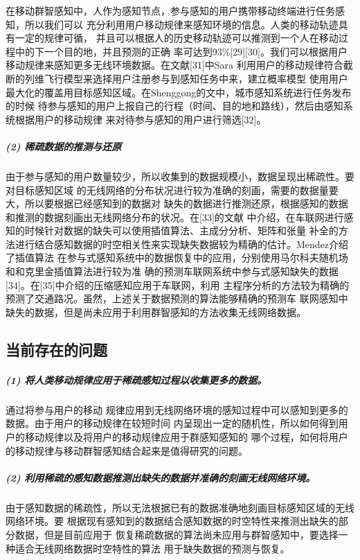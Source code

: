 \documentclass[UTF8]{ctexart}
\begin{document}
在移动群智感知中，人作为感知节点，参与感知的用户携带移动终端进行任务感知，所以我们可以
充分利用用户移动规律来感知环境的信息。人类的移动轨迹具有一定的规律可循，
并且可以根据人的历史移动轨迹可以推测到一个人在移动过程中的下一个目的地，并且预测的正确
率可达到93\%[29][30]。我们可以根据用户移动规律来感知更多无线环境数据。在文献[31]中Sara
利用用户的移动规律符合截断的列维飞行模型来选择用户注册参与到感知任务中来，建立概率模型
使用用户最大化的覆盖用目标感知区域。在Shenggong的文中，城市感知系统进行任务发布的时候
待参与感知的用户上报自己的行程（时间、目的地和路线），然后由感知系统根据用户的移动规律
来对待参与感知的用户进行筛选[32]。

\subparagraph{\textbf{(2) 稀疏数据的推测与还原}}

由于参与感知的用户数量较少，所以收集到的数据规模小，数据呈现出稀疏性。要对目标感知区域
的无线网络的分布状况进行较为准确的刻画，需要的数据量要大，所以要根据已经感知到的数据对
缺失的数据进行推测还原，根据感知的数据和推测的数据刻画出无线网络分布的状况。在[33]的文献
中介绍，在车联网进行感知的时候针对数据的缺失可以使用插值算法、主成分分析、矩阵和张量
补全的方法进行结合感知数据的时空相关性来实现缺失数据较为精确的估计。Mendez介绍了插值算法
在参与式感知系统中的数据恢复中的应用，分别使用马尔科夫随机场和和克里金插值算法进行较为准
确的预测车联网系统中参与式感知缺失的数据[34]。在[35]中介绍的压缩感知应用于车联网，利用
主程序分析的方法较为精确的预测了交通路况。虽然，上述关于数据预测的算法能够精确的预测车
联网感知中缺失的数据，但是尚未应用于利用群智感知的方法收集无线网络数据。

\subsection{当前存在的问题}
\subparagraph{(1) 将人类移动规律应用于稀疏感知过程以收集更多的数据。}

通过将参与用户的移动
规律应用到无线网络环境的感知过程中可以感知到更多的数据。由于用户的移动规律在较短时间
内呈现出一定的随机性，所以如何得到用户的移动规律以及将用户的移动规律应用于群感知感知的
哪个过程，如何将用户的移动规律与移动群智感知结合起来是值得研究的问题。

\subparagraph{(2) 利用稀疏的感知数据推测出缺失的数据并准确的刻画无线网络环境。}

由于感知数据的稀疏性，所以无法根据已有的数据准确地刻画目标感知区域的无线网络环境。要
根据现有感知到的数据结合感知数据的时空特性来推测出缺失的部分数据，但是目前应用于
恢复稀疏数据的算法尚未应用与群智感知中，要选择一种适合无线网络数据时空特性的算法
用于缺失数据的预测与恢复。
\end{document}
